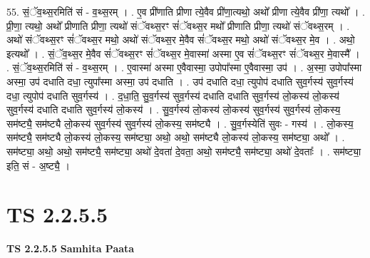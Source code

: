 \documentclass[17pt]{extarticle}
\begin{document}
55. सं॒ॅव॒थ्स॒रमिति॑ सं - व॒थ्स॒रम् । . ए॒व प्री॑णाति प्रीणा त्ये॒वैव प्री॑णा॒त्यथो॒ अथो᳚ प्रीणा त्ये॒वैव प्री॑णा॒ त्यथो᳚ । . प्री॒णा॒ त्यथो॒ अथो᳚ प्रीणाति प्रीणा॒ त्यथो॑ संॅवथ्स॒रꣳ सं॑ॅवथ्स॒र मथो᳚ प्रीणाति प्रीणा॒ त्यथो॑ संॅवथ्स॒रम् । . अथो॑ संॅवथ्स॒रꣳ सं॑ॅवथ्स॒र मथो॒ अथो॑ संॅवथ्स॒र मे॒वैव सं॑ॅवथ्स॒र मथो॒ अथो॑ संॅवथ्स॒र मे॒व । . अथो॒ इत्यथो᳚ । . सं॒ॅव॒थ्स॒र मे॒वैव सं॑ॅवथ्स॒रꣳ सं॑ॅवथ्स॒र मे॒वास्मा॑ अस्मा ए॒व सं॑ॅवथ्स॒रꣳ सं॑ॅवथ्स॒र मे॒वास्मै᳚ । . सं॒ॅव॒थ्स॒रमिति॑ सं - व॒थ्स॒रम् । . ए॒वास्मा॑ अस्मा ए॒वैवास्मा॒ उपोपा᳚स्मा ए॒वैवास्मा॒ उप॑ । . अ॒स्मा॒ उपोपा᳚स्मा अस्मा॒ उप॑ दधाति दधा॒ त्युपा᳚स्मा अस्मा॒ उप॑ दधाति । . उप॑ दधाति दधा॒ त्युपोप॑ दधाति सुव॒र्गस्य॑ सुव॒र्गस्य॑ दधा॒ त्युपोप॑ दधाति सुव॒र्गस्य॑ । . द॒धा॒ति॒ सु॒व॒र्गस्य॑ सुव॒र्गस्य॑ दधाति दधाति सुव॒र्गस्य॑ लो॒कस्य॑ लो॒कस्य॑ सुव॒र्गस्य॑ दधाति दधाति सुव॒र्गस्य॑ लो॒कस्य॑ । . सु॒व॒र्गस्य॑ लो॒कस्य॑ लो॒कस्य॑ सुव॒र्गस्य॑ सुव॒र्गस्य॑ लो॒कस्य॒ सम॑ष्ट्यै॒ सम॑ष्ट्यै लो॒कस्य॑ सुव॒र्गस्य॑ सुव॒र्गस्य॑ लो॒कस्य॒ सम॑ष्ट्यै । . सु॒व॒र्गस्येति॑ सुवः - गस्य॑ । . लो॒कस्य॒ सम॑ष्ट्यै॒ सम॑ष्ट्यै लो॒कस्य॑ लो॒कस्य॒ सम॑ष्ट्या॒ अथो॒ अथो॒ सम॑ष्ट्यै लो॒कस्य॑ लो॒कस्य॒ सम॑ष्ट्या॒ अथो᳚ । . सम॑ष्ट्या॒ अथो॒ अथो॒ सम॑ष्ट्यै॒ सम॑ष्ट्या॒ अथो॑ दे॒वता॑ दे॒वता॒ अथो॒ सम॑ष्ट्यै॒ सम॑ष्ट्या॒ अथो॑ दे॒वताः᳚ । . सम॑ष्ट्या॒ इति॒ सं - अ॒ष्ट्यै॒ । \newline
\pagebreak
{}

\section{ TS 2.2.5.5 }

\textbf{TS 2.2.5.5 } \newline
\textbf{Samhita Paata} \newline
\end{document}
